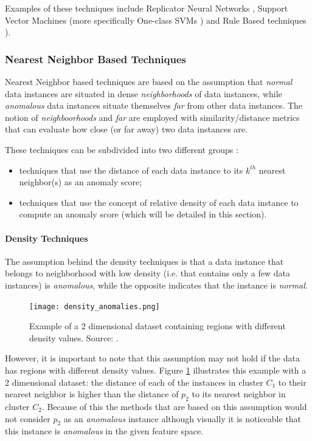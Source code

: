 Examples of these techniques include Replicator Neural Networks \cite{Hawkins}, Support Vector Machines (more specifically One-class SVMs \cite{Sc}) and Rule Based techniques \cite{Kandhari2009}).

\subsubsection{Nearest Neighbor Based Techniques}

Nearest Neighbor based techniques are based on the assumption that \textit{normal} data instances are situated in dense \textit{neighborhoods} of data instances, while \textit{anomalous} data instances situate themselves \textit{far} from other data instances.
The notion of \textit{neighboorhoods} and \textit{far} are employed with similarity/distance metrics that can evaluate how close (or far away) two data instances are.

These techniques can be subdivided into two different groups \cite{Kandhari2009}:
\begin{itemize}
	\item techniques that use the distance of each data instance to its $k^{th}$ nearest neighbor(s) as an anomaly score;
	
	\item techniques that use the concept of relative density of each data instance to compute an anomaly score (which will be detailed in this section).
\end{itemize}

\paragraph{Density Techniques}\mbox{}

The assumption behind the density techniques is that a data instance that belongs to neighborhood with low density (i.e. that contains only a few data instances) is \textit{anomalous}, while the opposite indicates that the instance is \textit{normal}.

\begin{figure}[!ht]
	\centering
	\texttt{[image: density\_anomalies.png]}
	\caption{Example of a 2 dimensional dataset containing regions with different density values. Source: \cite{Kandhari2009}.}
	\label{fig:local_density}
\end{figure}

However, it is important to note that this assumption may not hold if the data has regions with different density values. Figure \ref{fig:local_density} illustrates this example with a 2 dimensional dataset: the distance of each of the instances in cluster $C_1$ to their nearest neighbor is higher than the distance of $p_2$ to its nearest neighbor in cluster $C_2$. Because of this the methods that are based on this assumption would not consider $p_2$ as an \textit{anomalous} instance although visually it is noticeable that this instance is \textit{anomalous} in the given feature space.

